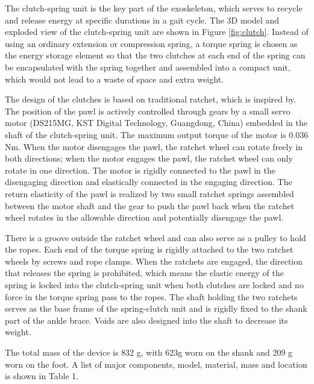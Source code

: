 \documentclass[twocolumn,cleanfoot,10pt]{asme2ej}
\begin{document}
The clutch-spring unit is the key part of the exoskeleton, which serves to recycle and release energy at specific durations in a gait cycle.
The 3D model and exploded view of the clutch-spring unit are shown in Figure \ref{fig:clutch}.
Instead of using an ordinary extension or compression spring, a torque spring is chosen as the energy storage element so that the two clutches at each end of the spring can be encapsulated with the spring together and assembled into a compact unit, which would not lead to a waste of space and extra weight. 

The design of the clutches is based on traditional ratchet, which is inspired by\cite{RN19}.
The position of the pawl is actively controlled through gears by a small servo motor (DS215MG, KST Digital Technology, Guangdong, China) embedded in the shaft of the clutch-spring unit.
The maximum output torque of the motor is 0.036 Nm. When the motor disengages the pawl, the ratchet wheel can rotate freely in both directions; when the motor engages the pawl, the ratchet wheel can only rotate in one direction.
The motor is rigidly connected to the pawl in the disengaging direction and elastically connected in the engaging direction.
The return elasticity of the pawl is realized by two small ratchet springs assembled between the motor shaft and the gear to push the pawl back when the ratchet wheel rotates in the allowable direction and potentially disengage the pawl.

There is a groove outside the ratchet wheel and can also serve as a pulley to hold the ropes.
Each end of the torque spring is rigidly attached to the two ratchet wheels by screws and rope clamps.
When the ratchets are engaged, the direction that releases the spring is prohibited, which means the elastic energy of the spring is locked into the clutch-spring unit when both clutches are locked and no force in the torque spring pass to the ropes.
The shaft holding the two ratchets serves as the base frame of the spring-clutch unit and is rigidly fixed to the shank part of the ankle brace.
Voids are also designed into the shaft to decrease its weight.

The total mass of the device is 832 g, with 623g worn on the shank and 209 g worn on the foot.
A list of major components, model, material, mass and location is shown in
Table 1.  

\end{document}
